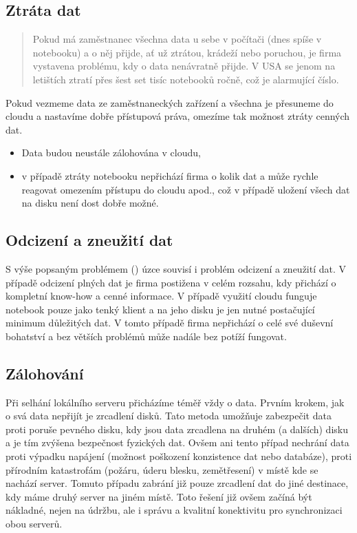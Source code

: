 \subsection{Ztráta dat}
\label{sec:ZtrataDat}
\begin{quote}
Pokud má zaměstnanec všechna data u sebe v počítači (dnes spíše v notebooku) a o něj přijde, ať už ztrátou, krádeží nebo poruchou, je firma vystavena problému, kdy o data nenávratně přijde. V USA se jenom na letištích ztratí přes šest set tisíc notebooků ročně, což je alarmující číslo. \cite{notebook:ztraceneNBnaLetistich}
\end{quote}


Pokud vezmeme data ze zaměstnaneckých zařízení a všechna je přesuneme do cloudu a nastavíme dobře přístupová práva, omezíme tak možnost ztráty cenných dat. 
\begin{itemize}
	\item Data budou neustále zálohována v cloudu,
	\item v případě ztráty notebooku nepřichází firma o kolik dat a může rychle reagovat omezením přístupu do cloudu apod., což v případě uložení všech dat na disku není dost dobře možné.
\end{itemize}

\subsection{Odcizení a zneužití dat}
S výše popsaným problémem () úzce souvisí i problém odcizení a zneužití dat. V případě odcizení plných dat je firma postižena v celém rozsahu, kdy přichází o kompletní know-how a cenné informace. V případě využití cloudu funguje notebook pouze jako tenký klient a na jeho disku je jen nutné postačující minimum důležitých dat. V tomto případě firma nepřichází o celé své duševní bohatství a bez větších problémů může nadále bez potíží fungovat.

\subsection{Zálohování}
Při selhání lokálního serveru přicházíme téměř vždy o data. Prvním krokem, jak o svá data nepřijít je zrcadlení disků. Tato metoda umožňuje zabezpečit data proti poruše pevného disku, kdy jsou data zrcadlena na druhém (a dalších) disku a je tím zvýšena bezpečnost fyzických dat. Ovšem ani tento případ nechrání data proti výpadku napájení (možnost poškození konzistence dat nebo databáze), proti přírodním katastrofám (požáru, úderu blesku, zemětřesení) v místě kde se nachází server. Tomuto případu zabrání již pouze zrcadlení dat do jiné destinace, kdy máme druhý server na jiném místě. Toto řešení již ovšem začíná být nákladné, nejen na údržbu, ale i správu a kvalitní konektivitu pro synchronizaci obou serverů.

